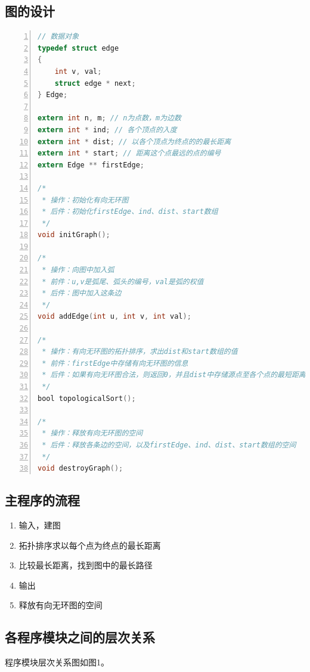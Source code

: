\documentclass{article}
\begin{document}
\subsection{图的设计}

\begin{lstlisting}[language={C},
    numbers=left,
    numberstyle=\tiny\consolas,
    basicstyle=\small\consolas]
// 数据对象
typedef struct edge
{
    int v, val;
    struct edge * next;
} Edge;

extern int n, m; // n为点数，m为边数
extern int * ind; // 各个顶点的入度
extern int * dist; // 以各个顶点为终点的的最长距离
extern int * start; // 距离这个点最远的点的编号
extern Edge ** firstEdge;

/*
 * 操作：初始化有向无环图
 * 后件：初始化firstEdge、ind、dist、start数组
 */
void initGraph();

/*
 * 操作：向图中加入弧
 * 前件：u,v是弧尾、弧头的编号，val是弧的权值
 * 后件：图中加入这条边
 */
void addEdge(int u, int v, int val);

/*
 * 操作：有向无环图的拓扑排序，求出dist和start数组的值
 * 前件：firstEdge中存储有向无环图的信息
 * 后件：如果有向无环图合法，则返回0，并且dist中存储源点至各个点的最短距离，start中记录最远的点的编号；否则函数返回1
 */
bool topologicalSort();

/*
 * 操作：释放有向无环图的空间
 * 后件：释放各条边的空间，以及firstEdge、ind、dist、start数组的空间
 */
void destroyGraph();

\end{lstlisting}

\subsection{主程序的流程}

\begin{enumerate}
    \item 输入，建图
    \item 拓扑排序求以每个点为终点的最长距离
    \item 比较最长距离，找到图中的最长路径
    \item 输出
    \item 释放有向无环图的空间
\end{enumerate}

\subsection{各程序模块之间的层次关系}

程序模块层次关系图如图1。
\end{document}
